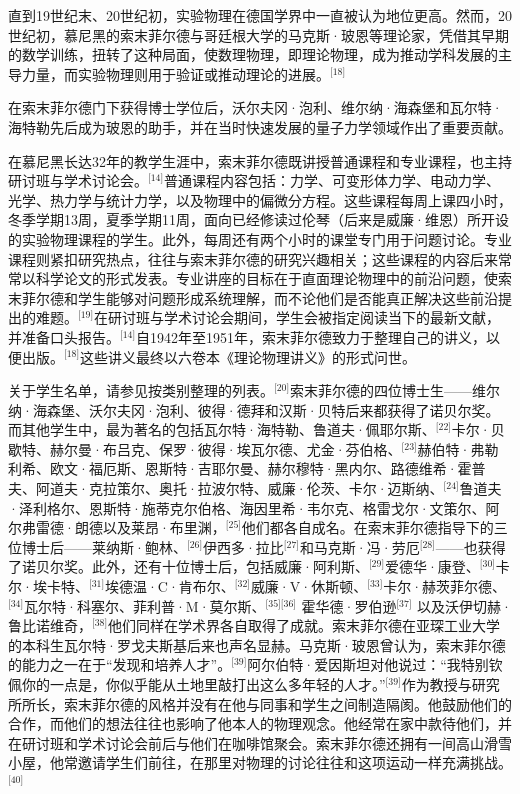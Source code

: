 直到19世纪末、20世纪初，实验物理在德国学界中一直被认为地位更高。然而，20世纪初，慕尼黑的索末菲尔德与哥廷根大学的马克斯·玻恩等理论家，凭借其早期的数学训练，扭转了这种局面，使数理物理，即理论物理，成为推动学科发展的主导力量，而实验物理则用于验证或推动理论的进展。\(^\text{[18]}\)

在索末菲尔德门下获得博士学位后，沃尔夫冈·泡利、维尔纳·海森堡和瓦尔特·海特勒先后成为玻恩的助手，并在当时快速发展的量子力学领域作出了重要贡献。

在慕尼黑长达32年的教学生涯中，索末菲尔德既讲授普通课程和专业课程，也主持研讨班与学术讨论会。\(^\text{[14]}\)普通课程内容包括：力学、可变形体力学、电动力学、光学、热力学与统计力学，以及物理中的偏微分方程。这些课程每周上课四小时，冬季学期13周，夏季学期11周，面向已经修读过伦琴（后来是威廉·维恩）所开设的实验物理课程的学生。此外，每周还有两个小时的课堂专门用于问题讨论。专业课程则紧扣研究热点，往往与索末菲尔德的研究兴趣相关；这些课程的内容后来常常以科学论文的形式发表。专业讲座的目标在于直面理论物理中的前沿问题，使索末菲尔德和学生能够对问题形成系统理解，而不论他们是否能真正解决这些前沿提出的难题。\(^\text{[19]}\)在研讨班与学术讨论会期间，学生会被指定阅读当下的最新文献，并准备口头报告。\(^\text{[14]}\)自1942年至1951年，索末菲尔德致力于整理自己的讲义，以便出版。\(^\text{[18]}\)这些讲义最终以六卷本《理论物理讲义》的形式问世。

关于学生名单，请参见按类别整理的列表。\(^\text{[20]}\)索末菲尔德的四位博士生——维尔纳·海森堡、沃尔夫冈·泡利、彼得·德拜和汉斯·贝特后来都获得了诺贝尔奖。而其他学生中，最为著名的包括瓦尔特·海特勒、鲁道夫·佩耶尔斯、\(^\text{[22]}\)卡尔·贝歇特、赫尔曼·布吕克、保罗·彼得·埃瓦尔德、尤金·芬伯格、\(^\text{[23]}\)赫伯特·弗勒利希、欧文·福厄斯、恩斯特·吉耶尔曼、赫尔穆特·黑内尔、路德维希·霍普夫、阿道夫·克拉策尔、奥托·拉波尔特、威廉·伦茨、卡尔·迈斯纳、\(^\text{[24]}\)鲁道夫·泽利格尔、恩斯特·施蒂克尔伯格、海因里希·韦尔克、格雷戈尔·文策尔、阿尔弗雷德·朗德以及莱昂·布里渊，\(^\text{[25]}\)他们都各自成名。在索末菲尔德指导下的三位博士后——莱纳斯·鲍林、\(^\text{[26]}\)伊西多·拉比\(^\text{[27]}\)和马克斯·冯·劳厄\(^\text{[28]}\)——也获得了诺贝尔奖。此外，还有十位博士后，包括威廉·阿利斯、\(^\text{[29]}\)爱德华·康登、\(^\text{[30]}\)卡尔·埃卡特、\(^\text{[31]}\)埃德温·C·肯布尔、\(^\text{[32]}\)威廉·V·休斯顿、\(^\text{[33]}\)卡尔·赫茨菲尔德、\(^\text{[34]}\)瓦尔特·科塞尔、菲利普·M·莫尔斯、\(^\text{[35][36]}\) 霍华德·罗伯逊\(^\text{[37]}\) 以及沃伊切赫·鲁比诺维奇，\(^\text{[38]}\)他们同样在学术界各自取得了成就。索末菲尔德在亚琛工业大学的本科生瓦尔特·罗戈夫斯基后来也声名显赫。马克斯·玻恩曾认为，索末菲尔德的能力之一在于“发现和培养人才”。\(^\text{[39]}\)阿尔伯特·爱因斯坦对他说过：“我特别钦佩你的一点是，你似乎能从土地里敲打出这么多年轻的人才。”\(^\text{[39]}\)作为教授与研究所所长，索末菲尔德的风格并没有在他与同事和学生之间制造隔阂。他鼓励他们的合作，而他们的想法往往也影响了他本人的物理观念。他经常在家中款待他们，并在研讨班和学术讨论会前后与他们在咖啡馆聚会。索末菲尔德还拥有一间高山滑雪小屋，他常邀请学生们前往，在那里对物理的讨论往往和这项运动一样充满挑战。\(^\text{[40]}\)


